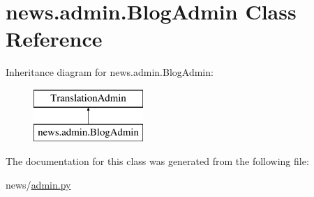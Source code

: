 \hypertarget{classnews_1_1admin_1_1_blog_admin}{}\section{news.\+admin.\+Blog\+Admin Class Reference}
\label{classnews_1_1admin_1_1_blog_admin}
Inheritance diagram for news.\+admin.\+Blog\+Admin\+:\begin{figure}[H]
\begin{center}
\leavevmode
\includegraphics[height=2.000000cm]{classnews_1_1admin_1_1_blog_admin}
\end{center}
\end{figure}


The documentation for this class was generated from the following file\+:\begin{DoxyCompactItemize}
\item 
news/\mbox{\hyperlink{admin_8py}{admin.\+py}}\end{DoxyCompactItemize}
